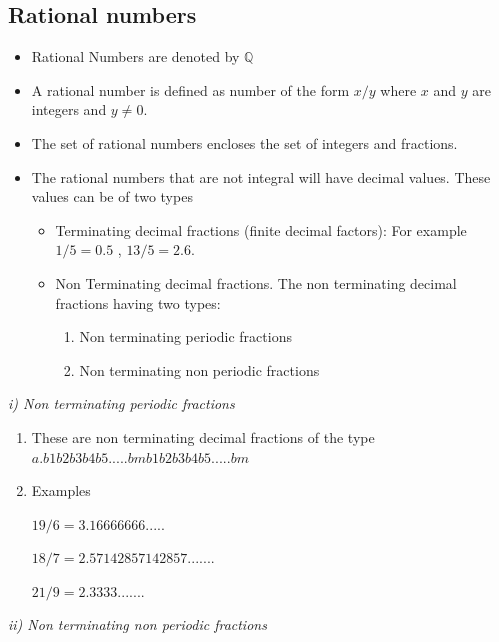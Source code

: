 \documentclass[]{book}
\providecommand{\tightlist}{%
  \setlength{\itemsep}{0pt}\setlength{\parskip}{0pt}}
\begin{document}
\hypertarget{rational-numbers}{%
\subsection{Rational numbers}\label{rational-numbers}}

\begin{itemize}
\item
  Rational Numbers are denoted by \(\mathbb{Q}\)
\item
  A rational number is defined as number of the form \(x/y\) where \(x\) and \(y\) are integers and \(y \neq 0\).
\item
  The set of rational numbers encloses the set of integers and fractions.
\item
  The rational numbers that are not integral will have decimal values. These values can be of two types

  \begin{itemize}
  \tightlist
  \item
    Terminating decimal fractions (finite decimal factors): For example \(1/5 = 0.5\) , \(13/5 = 2.6\).
  \item
    Non Terminating decimal fractions. The non terminating decimal fractions having two types:

    \begin{enumerate}
    \def\labelenumi{\roman{enumi})}
    \tightlist
    \item
      Non terminating periodic fractions
    \item
      Non terminating non periodic fractions
    \end{enumerate}
  \end{itemize}
\end{itemize}

\emph{i) Non terminating periodic fractions}

\begin{enumerate}
\def\labelenumi{\alph{enumi}.}
\item
  These are non terminating decimal fractions of the type \(a.b1b2b3b4b5 .....bmb1b2b3b4b5 .....bm\)
\item
  Examples

  \(19/6 = 3.16666666.....\)

  \(18/7 = 2.57142857142857.......\)

  \(21/9= 2.3333.......\)
\end{enumerate}

\emph{ii) Non terminating non periodic fractions}
\end{document}
